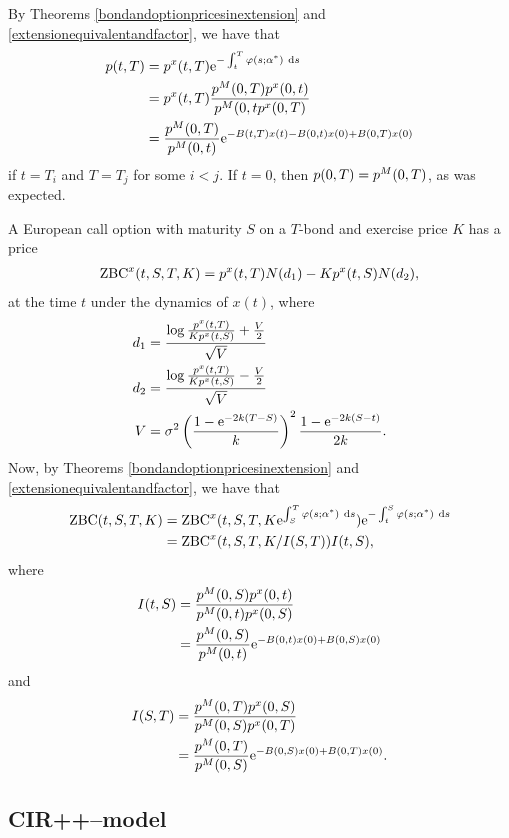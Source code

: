 By Theorems \ref{bondandoptionpricesinextension} and \ref{extensionequivalentandfactor}, we have that
	\begin{align}
		p(t,T) &= p^x(t,T) \mathrm{e}^{ - \int_t^T \varphi(s; \alpha^*) \ \mathrm{d} s} \\
			&= p^x(t,T) \frac{p^M(0,T) p^x(0,t)}{p^M(0,t p^x(0,T)} \\
			&= \frac{p^M(0,T) }{p^M(0,t)} \mathrm{e}^{ -B(t,T)x(t) -B(0,t)x(0) + B(0,T)x(0) }
	\end{align}
if $t = T_i$ and $T = T_j$ for some $i < j$. If $t=0$, then $p(0,T) = p^M(0,T)$, as was expected.

A European call option with maturity $S$ on a $T$-bond and exercise price $K$ has a price
\begin{align}
\operatorname{\mathrm{ZBC}}^x(t, S, T, K) = p^x(t,T) N(d_1) - K p^x(t,S) N(d_2),
\end{align}
at the time $t$ under the dynamics of $x(t)$, where
\begin{align}
d_1 &= \frac{ \log \frac{p^x(t,T)}{K p^x(t,S)} + \frac{V}{2} }{ \sqrt{V} } \\
d_2 &= \frac{ \log \frac{p^x(t,T)}{K p^x(t,S)} - \frac{V}{2} }{ \sqrt{V} } \\
V &= \sigma^2 \left( \frac{1 - \mathrm{e}^{-2k(T-S)}}{k} \right)^2 \frac{1 - \mathrm{e}^{-2k(S-t)}}{2k} .
\end{align}
Now, by Theorems \ref{bondandoptionpricesinextension} and \ref{extensionequivalentandfactor}, we have that
	\begin{align}
	\operatorname{\mathrm{ZBC}}(t,S,T,K) &=  \operatorname{\mathrm{ZBC}}^x(t,S,T,K\mathrm{e}^{ \int_S^T \varphi(s; \alpha^*) \ \mathrm{d} s}) \mathrm{e}^{ - \int_t^S \varphi(s; \alpha^*) \ \mathrm{d} s} \\
		&= \operatorname{\mathrm{ZBC}}^x(t,S,T,K/I(S,T)) I(t,S),
	\end{align}
where
	\begin{align}
		I(t,S) &= \frac{p^M(0,S) p^x(0,t)}{p^M(0,t) p^x(0,S)} \\
				&= \frac{p^M(0,S) }{p^M(0,t)} \mathrm{e}^{ -B(0,t)x(0) + B(0,S)x(0) } \end{align}
and
	\begin{align}
		I(S,T) &= \frac{p^M(0,T) p^x(0,S)}{p^M(0,S) p^x(0,T)} \\
			&= \frac{p^M(0,T) }{p^M(0,S)} \mathrm{e}^{ -B(0,S)x(0) + B(0,T)x(0) } .
	\end{align}
	
\subsection{CIR++--model}

